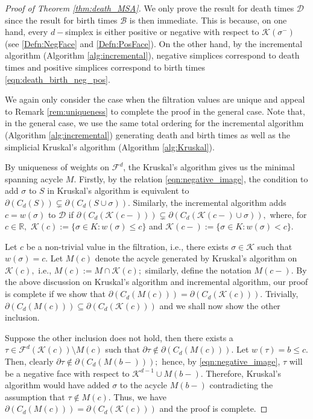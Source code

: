 \documentclass[12pt]{amsart}
\newcommand{\gt}[1]{\textcolor{blue}{#1}}
\newcommand{\remove}[1]{}
\renewcommand{\gt}[1]{#1}
\numberwithin{equation}{section}
\numberwithin{theorem}{section}
\newcommand{\Real}{\mathbb R}
\newcommand{\1}{\mathbf{1}}
\def\F{\mathcal{F}}
\def\K{\mathcal{K}}
\begin{document}
\begin{proof}[Proof of Theorem \ref{thm:death_MSA}]
\gt{We only prove the result for death times  $\mathcal{D}$ since the result for birth times $\mathcal{B}$ is then immediate. This is because, on one hand, every $d-$simplex is either positive or negative with respect to $\K(\sigma^-)$ (see \eqref{Defn:NegFace} and \eqref{Defn:PosFace}). On the other hand, by the incremental algorithm (Algorithm \ref{alg:incremental}), negative simplices correspond to death times and positive simplices correspond to birth times \eqref{eqn:death_birth_neg_pos}. \remove{, the result for $\mathcal{D}$ implies that for $\mathcal{B}$.}}

We again only consider the case when the filtration values are unique and appeal to Remark \ref{rem:uniqueness} to complete the proof in the general case. Note that, in the general case, we use the same total ordering for the incremental algorithm (Algorithm \ref{alg:incremental}) generating death and birth times as well as the simplicial Kruskal's algorithm (Algorithm \ref{alg:Kruskal}).

By uniqueness of weights on $\F^d$, the Kruskal's algorithm gives us the minimal spanning acycle $M$. Firstly, by the relation \eqref{eqn:negative_image}, the condition to add $\sigma$ to $S$ in Kruskal's algorithm is equivalent to $\partial(C_d(S)) \subsetneq \partial(C_d(S \cup \sigma))$. \gt{Similarly,  the  incremental algorithm adds $c = w(\sigma)$ to $\mathcal{D}$ if $ \partial(C_d(\K(c-))) \subsetneq \partial(C_d(\K(c-) \cup \sigma)),$ where, for $c \in \Real,$ $\K(c) := \{\sigma \in K: w(\sigma) \leq c\}$ and  $\K(c-) := \{\sigma \in K: w(\sigma) < c\}.$} 

Let $c$ be a \gt{non-trivial} value in the filtration, i.e., there exists $\sigma \in \K$ such that $w(\sigma) = c$. Let $M(c)$ denote the acycle generated by Kruskal's algorithm on $\K(c),$ i.e., $M(c) := M \cap \K(c);$ similarly, define the notation $M(c-).$ By the above discussion on Kruskal's algorithm and incremental algorithm, our proof is complete if we show that $\partial(C_d(M(c))) = \partial(C_d(\K(c)))$. Trivially, $\partial(C_d(M(c))) \subseteq \partial(C_d(\K(c)))$ and we shall now show the other inclusion.

Suppose the other inclusion does not hold, then there exists a $\tau \in \F^d(\K(c)) \setminus M(c)$ such that $\partial \tau \notin \partial (C_d(M(c)))$. \gt{Let $w(\tau) = b \leq c$}. Then, clearly $\partial \tau \notin \partial (C_d(M(b-)));$ hence, by \eqref{eqn:negative_image}, $\tau$ will be a negative face with respect to $\K^{d-1} \cup M(b-)$. Therefore, Kruskal's algorithm would have added $\sigma$ to the acycle $M(b-)$ contradicting the assumption that $\tau \notin M(c)$. Thus, we have $\partial(C_d(M(c))) = \partial(C_d(\K(c)))$ and the proof is complete.
\end{proof}
\end{document}
